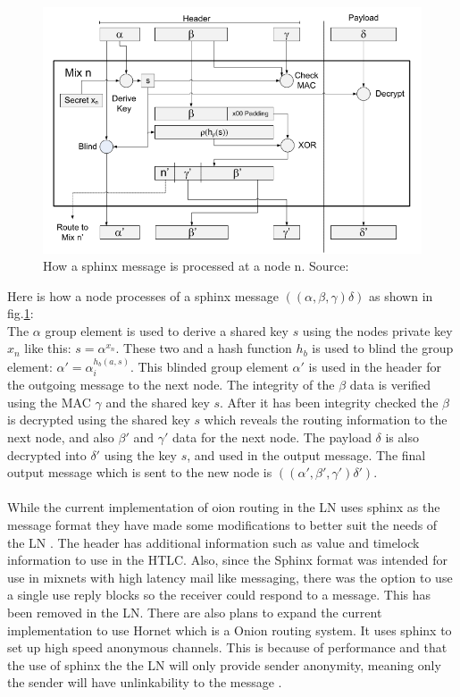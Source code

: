 \documentclass[informationsecurity]{gucmasterproject}
\begin{document}
\begin{figure}[h]
    \centering
    \includegraphics[width=12cm]{figs/sphinx.png}
    \caption{ How a sphinx message is processed at a node n. Source: \cite{danezis2009sphinx}}
    \label{fig:sphinx}
\end{figure}

\noindent
Here is how a node processes of a sphinx message $((\alpha, \beta, \gamma)\delta)$ as shown in fig.\ref{fig:sphinx}:\\
The $\alpha$ group element is used to derive a shared key $s$ using the nodes private key $x_n$ like this: $s = \alpha^{x_n}$.
These two and a hash function $h_b$ is used to blind the group element: $\alpha'= \alpha_i^{h_b(a,s)}$.
This blinded group element $\alpha'$ is used in the header for the outgoing message to the next node.
The integrity of the $\beta$ data is verified using the MAC $\gamma$ and the shared key $s$.
After it has been integrity checked the $\beta$ is decrypted using the shared key $s$ which reveals the routing information to the next node, and also $\beta'$ and $\gamma'$ data for the next node. 
The payload $\delta$ is also decrypted into $\delta'$ using the key $s$, and used in the output message.
The final output message which is sent to the new node is $((\alpha', \beta', \gamma')\delta')$.

\paragraph{}
While the current implementation of oion routing in the LN uses sphinx as the message format they have made some modifications to better suit the needs of the LN \cite{LN_onion_implementation}. The header has additional information such as value and timelock information to use in the HTLC. Also, since the Sphinx format was intended for use in mixnets with high latency mail like messaging, there was the option to use a single use reply blocks so the receiver could respond to a message. This has been removed in the LN. There are also plans to expand the current implementation to use Hornet \cite{chen2015hornet} which is a Onion routing system. It uses sphinx to set up high speed anonymous channels. This is because of performance and that the use of sphinx the the LN will only provide sender anonymity, meaning only the sender will have unlinkability to the message \cite{LNDM_onion}.





%

\end{document}
